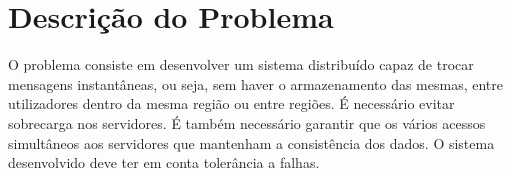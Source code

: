 \chapter{Descrição do Problema}

O problema consiste em desenvolver um sistema distribuído capaz de trocar mensagens instantâneas, ou seja, sem haver o armazenamento das mesmas, entre utilizadores dentro da mesma região ou entre regiões. É necessário evitar sobrecarga nos servidores. É também necessário garantir que os vários acessos simultâneos aos servidores que mantenham a consistência dos dados. O sistema desenvolvido deve ter em conta tolerância a falhas.